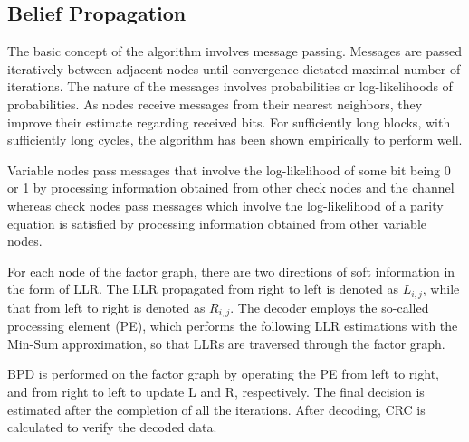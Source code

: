 \subsection{Belief Propagation}
The basic concept of the algorithm involves message passing. Messages are passed iteratively between adjacent nodes until convergence dictated maximal number of iterations. The nature of the messages involves probabilities or log-likelihoods of probabilities. As nodes receive messages from their nearest neighbors, they improve their estimate regarding received bits. For sufficiently long blocks, with sufficiently long cycles, the algorithm has been shown empirically to perform well.

Variable nodes pass messages that involve the log-likelihood of some bit being 0 or 1 by processing information obtained from other check nodes and the channel whereas check nodes pass messages which involve the log-likelihood of a parity equation is satisfied by processing information obtained from other variable nodes.

For each node of the factor graph, there are two directions of soft information in the form of LLR. The LLR propagated from right to left is denoted as $L_{i,j}$, while that from left to right is denoted as $R_{i,j}$. The decoder employs the so-called processing element (PE), which performs the following LLR estimations with the Min-Sum approximation, so that LLRs are traversed through the factor graph.

BPD is performed on the factor graph by operating the PE from left to right, and from right to left to update L and R, respectively. The final decision is estimated after the completion of all the  iterations. After decoding, CRC is calculated to verify the decoded data.









